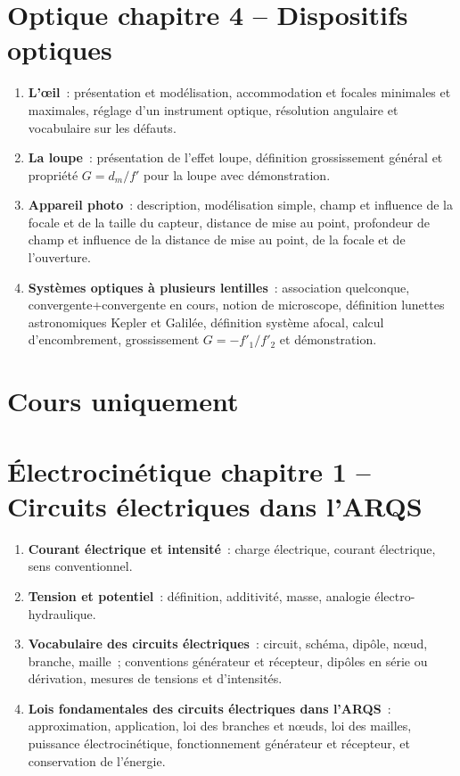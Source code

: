 \documentclass[a4paper, 12pt, final, garamond]{book}
\begin{document}
\section*{Optique chapitre 4 -- Dispositifs optiques}
\begin{enumerate}[label=\Roman*]
    \item \textbf{L'œil}~: présentation et modélisation, accommodation et
        focales minimales et maximales, réglage d'un instrument optique,
        résolution angulaire et vocabulaire sur les défauts.
    \item \textbf{La loupe}~: présentation de l'effet loupe, définition
        grossissement général et propriété $G = d_m/f'$ pour la loupe avec
        démonstration.
    \item \textbf{Appareil photo}~: description, modélisation simple, champ et
        influence de la focale et de la taille du capteur, distance de mise au
        point, profondeur de champ et influence de la distance de mise au point,
        de la focale et de l'ouverture.
    \item \textbf{Systèmes optiques à plusieurs lentilles}~: association
        quelconque, convergente+convergente en cours, notion de microscope,
        définition lunettes astronomiques Kepler et Galilée, définition système
        afocal, calcul d'encombrement, grossissement $G=-f'_1/f'_2$ et
        démonstration.
\end{enumerate}

\section{Cours uniquement}

\section*{Électrocinétique chapitre 1 -- Circuits électriques dans l'ARQS}
\begin{enumerate}[label=\Roman*]
    \item \textbf{Courant électrique et intensité}~: charge électrique, courant
        électrique, sens conventionnel.
    \item \textbf{Tension et potentiel}~: définition, additivité, masse,
        analogie électro-hydraulique.
    \item \textbf{Vocabulaire des circuits électriques}~: circuit, schéma,
        dipôle, nœud, branche, maille~; conventions générateur et récepteur,
        dipôles en série ou dérivation, mesures de tensions et d'intensités.
    \item \textbf{Lois fondamentales des circuits électriques dans l'ARQS}~:
        approximation, application, loi des branches et nœuds, loi des mailles,
        puissance électrocinétique, fonctionnement générateur et récepteur, et
        conservation de l'énergie.
\end{enumerate}
\end{document}
